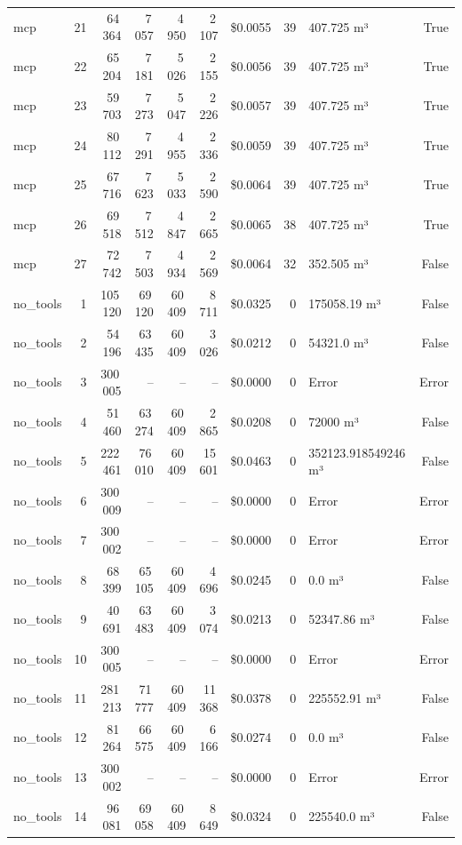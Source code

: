 \documentclass[a4paper,11pt]{article}
\begin{document}
\begin{table}[H]
{\begin{tabular}{l r r r r r r r l r}
mcp & 21 & 64\,364 & 7\,057 & 4\,950 & 2\,107 & \$0.0055 & 39 & 407.725 m³ & True \\
mcp & 22 & 65\,204 & 7\,181 & 5\,026 & 2\,155 & \$0.0056 & 39 & 407.725 m³ & True \\
mcp & 23 & 59\,703 & 7\,273 & 5\,047 & 2\,226 & \$0.0057 & 39 & 407.725 m³ & True \\
mcp & 24 & 80\,112 & 7\,291 & 4\,955 & 2\,336 & \$0.0059 & 39 & 407.725 m³ & True \\
mcp & 25 & 67\,716 & 7\,623 & 5\,033 & 2\,590 & \$0.0064 & 39 & 407.725 m³ & True \\
mcp & 26 & 69\,518 & 7\,512 & 4\,847 & 2\,665 & \$0.0065 & 38 & 407.725 m³ & True \\
mcp & 27 & 72\,742 & 7\,503 & 4\,934 & 2\,569 & \$0.0064 & 32 & 352.505 m³ & False \\
\midrule
no\_tools & 1 & 105\,120 & 69\,120 & 60\,409 & 8\,711 & \$0.0325 & 0 & 175058.19 m³ & False \\
no\_tools & 2 & 54\,196 & 63\,435 & 60\,409 & 3\,026 & \$0.0212 & 0 & 54321.0 m³ & False \\
no\_tools & 3 & 300\,005 & -- & -- & -- & \$0.0000 & 0 & Error & Error \\
no\_tools & 4 & 51\,460 & 63\,274 & 60\,409 & 2\,865 & \$0.0208 & 0 & 72000 m³ & False \\
no\_tools & 5 & 222\,461 & 76\,010 & 60\,409 & 15\,601 & \$0.0463 & 0 & 352123.918549246 m³ & False \\
no\_tools & 6 & 300\,009 & -- & -- & -- & \$0.0000 & 0 & Error & Error \\
no\_tools & 7 & 300\,002 & -- & -- & -- & \$0.0000 & 0 & Error & Error \\
no\_tools & 8 & 68\,399 & 65\,105 & 60\,409 & 4\,696 & \$0.0245 & 0 & 0.0 m³ & False \\
no\_tools & 9 & 40\,691 & 63\,483 & 60\,409 & 3\,074 & \$0.0213 & 0 & 52347.86 m³ & False \\
no\_tools & 10 & 300\,005 & -- & -- & -- & \$0.0000 & 0 & Error & Error \\
no\_tools & 11 & 281\,213 & 71\,777 & 60\,409 & 11\,368 & \$0.0378 & 0 & 225552.91 m³ & False \\
no\_tools & 12 & 81\,264 & 66\,575 & 60\,409 & 6\,166 & \$0.0274 & 0 & 0.0 m³ & False \\
no\_tools & 13 & 300\,002 & -- & -- & -- & \$0.0000 & 0 & Error & Error \\
no\_tools & 14 & 96\,081 & 69\,058 & 60\,409 & 8\,649 & \$0.0324 & 0 & 225540.0 m³ & False \\

\end{tabular}}
\end{table}
\end{document}
